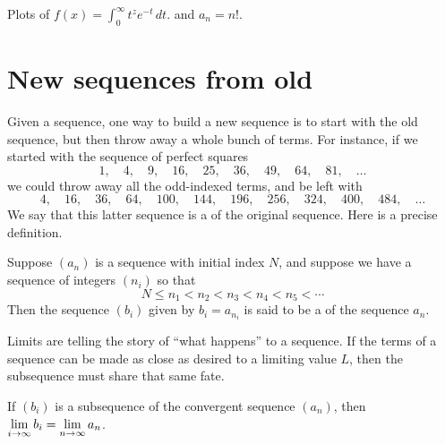 \begin{marginfigure}[0in]
\caption{Plots of $f(x) = \int_0^\infty t^{z} e^{-t} \, dt.$ and $a_n = n!$.}
\label{fig:gamma-function}
\end{marginfigure}

\section{New sequences from old}
\label{section:new-sequences-from-old}

Given a sequence, one way to build a new sequence is to start with the
old sequence, but then throw away a whole bunch of terms.  For
instance, if we started with the sequence of perfect squares
$$
1,\quad 4,\quad 9,\quad 16,\quad 25,\quad 36,\quad 49,\quad 64,\quad 81,\quad\ldots
$$
we could throw away all the odd-indexed terms, and be left with
$$
4,\quad 16,\quad 36,\quad 64,\quad 100,\quad 144,\quad 196,\quad 256,\quad 324,\quad 400,\quad 484,\quad\ldots
$$
We say that this latter sequence is a
of the original sequence.  Here is a precise definition.

\begin{definition}
  Suppose $(a_n)$ is a sequence with initial index $N$, and suppose we have a sequence of integers $(n_i)$ so that
  $$
  N \leq n_1 < n_2 < n_3 < n_4 < n_5 < \cdots 
  $$
  Then the sequence $(b_i)$ given by $b_i = a_{n_i}$ is said to be a 
  of the sequence $a_n$.
\end{definition}

Limits are telling the story of ``what happens'' to a sequence.  If
the terms of a sequence can be made as close as desired to a limiting
value $L$, then the subsequence must share that same fate.

\begin{theorem}
  \label{theorem:subsequence-same-limit}
  If $(b_i)$ is a subsequence of the convergent sequence $(a_n)$, then
  $\displaystyle\lim_{i \to \infty} b_i = \displaystyle\lim_{n \to \infty} a_n$.
\end{theorem}

